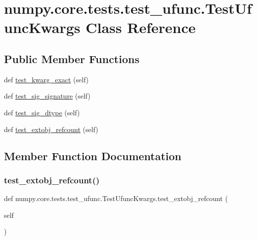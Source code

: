 \hypertarget{classnumpy_1_1core_1_1tests_1_1test__ufunc_1_1TestUfuncKwargs}{}\section{numpy.\+core.\+tests.\+test\+\_\+ufunc.\+Test\+Ufunc\+Kwargs Class Reference}
\label{classnumpy_1_1core_1_1tests_1_1test__ufunc_1_1TestUfuncKwargs}
\subsection*{Public Member Functions}
\begin{DoxyCompactItemize}
\item 
def \hyperlink{classnumpy_1_1core_1_1tests_1_1test__ufunc_1_1TestUfuncKwargs_aeacfa033458c39eb1a7fb5dfc00cddb9}{test\+\_\+kwarg\+\_\+exact} (self)
\item 
def \hyperlink{classnumpy_1_1core_1_1tests_1_1test__ufunc_1_1TestUfuncKwargs_a23ce33dd20c72f88856cf0731f1cb141}{test\+\_\+sig\+\_\+signature} (self)
\item 
def \hyperlink{classnumpy_1_1core_1_1tests_1_1test__ufunc_1_1TestUfuncKwargs_a508dfa3d6d164f773e0dbcd0f1261b4f}{test\+\_\+sig\+\_\+dtype} (self)
\item 
def \hyperlink{classnumpy_1_1core_1_1tests_1_1test__ufunc_1_1TestUfuncKwargs_a4f24c92a2cb9909da1ec3509df5a96f7}{test\+\_\+extobj\+\_\+refcount} (self)
\end{DoxyCompactItemize}


\subsection{Member Function Documentation}
\mbox{\label{classnumpy_1_1core_1_1tests_1_1test__ufunc_1_1TestUfuncKwargs_a4f24c92a2cb9909da1ec3509df5a96f7}} 
\subsubsection{\texorpdfstring{test\+\_\+extobj\+\_\+refcount()}{test\_extobj\_refcount()}}
{\footnotesize\ttfamily def numpy.\+core.\+tests.\+test\+\_\+ufunc.\+Test\+Ufunc\+Kwargs.\+test\+\_\+extobj\+\_\+refcount (\begin{DoxyParamCaption}\item[{}]{self }\end{DoxyParamCaption})}

